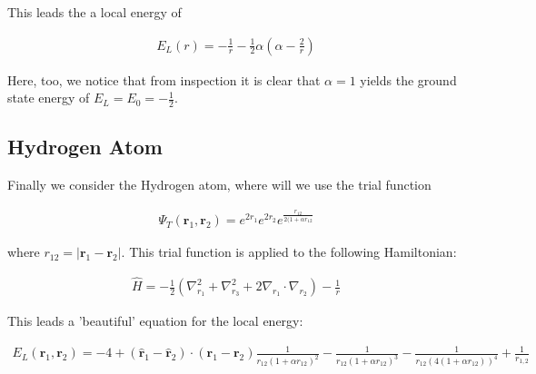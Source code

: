 This leads the a local energy of

  \begin{align}
    E_L(r) = - \frac{1}{r} - \frac{1}{2}\alpha(\alpha - \frac{2}{r})
  \end{align}
  
Here, too, we notice that from inspection it is clear that $\alpha = 1$ yields the ground state energy of $E_L = E_0 = -\frac{1}{2}$. 

\subsection{Hydrogen Atom}
Finally we consider the Hydrogen atom, where will we use the trial function 

  \begin{align}
    \Psi_T (\textbf{r}_1,\textbf{r}_2) = e^{2r_1}e^{2r_2}e^{\frac{r_{12}}{2(1+\alpha r_{12}}} 
  \end{align}

where $r_{12} = |\textbf{r}_1 - \textbf{r}_2 |$. This trial function is applied to the following Hamiltonian:
  
  \begin{align}
    \hat{H} = -\frac{1}{2}(\nabla_{r_1}^2 + \nabla_{r_3}^2 + 2\nabla_{r_1}\cdot \nabla_{r_2}) - \frac{1}{r}
  \end{align}
  
This leads a 'beautiful' equation for the local energy:

  \begin{align}
    E_L(\textbf{r}_1,\textbf{r}_2) = -4  + (\hat{\textbf{r}}_1 - \hat{\textbf{r}}_2) \cdot (\textbf{r}_1 - \textbf{r}_2) \frac{1}{r_{12}(1+\alpha r_{12})^2} -  \frac{1}{r_{12}(1+\alpha r_{12})^3} - \frac{1}{r_{12}(4(1+\alpha r_{12}))^4} + \frac{1}{r_{1,2}}   \end{align}
  

